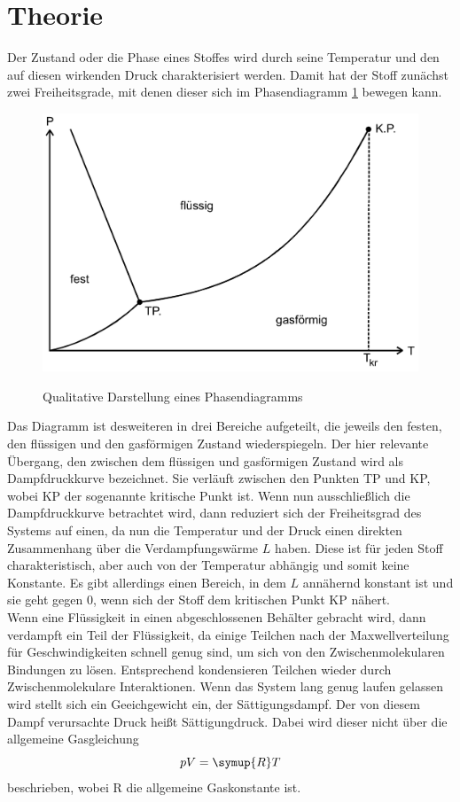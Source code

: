 \section{Theorie}
\label{sec:Theorie}
Der Zustand oder die Phase eines Stoffes wird durch seine Temperatur und den auf diesen wirkenden Druck charakterisiert werden.
Damit hat der Stoff zunächst zwei Freiheitsgrade, mit denen dieser sich im Phasendiagramm \ref{fig:phasendiagramm} bewegen kann.
\begin{figure}[H]
    \centering
    \caption{Qualitative Darstellung eines Phasendiagramms}
    \includegraphics[width=\textwidth]{Bilder/Phasendiagramm.png}%
    \label{fig:phasendiagramm}
\end{figure}
\noindent Das Diagramm ist desweiteren in drei Bereiche aufgeteilt, die jeweils den festen, den flüssigen und den gasförmigen Zustand wiederspiegeln.
Der hier relevante Übergang, den zwischen dem flüssigen und gasförmigen Zustand wird als Dampfdruckkurve bezeichnet.
Sie verläuft zwischen den Punkten TP und KP, wobei KP der sogenannte kritische Punkt ist. Wenn nun ausschließlich die 
Dampfdruckkurve betrachtet wird, dann reduziert sich der Freiheitsgrad des Systems auf einen, da nun die Temperatur und der
Druck einen direkten Zusammenhang über die Verdampfungswärme $L$ haben. Diese ist für jeden Stoff charakteristisch, aber auch 
von der Temperatur abhängig und somit keine Konstante. Es gibt allerdings einen Bereich, in dem $L$ annähernd konstant ist und
sie geht gegen 0, wenn sich der Stoff dem kritischen Punkt KP nähert.\\

\noindent Wenn eine Flüssigkeit in einen abgeschlossenen Behälter gebracht wird, dann verdampft ein Teil der Flüssigkeit, da einige Teilchen
nach der Maxwellverteilung für Geschwindigkeiten schnell genug sind, um sich von den Zwischenmolekularen Bindungen zu lösen. 
Entsprechend kondensieren Teilchen wieder durch Zwischenmolekulare Interaktionen. Wenn das System lang genug laufen gelassen
wird stellt sich ein Geeichgewicht ein, der Sättigungsdampf. Der von diesem Dampf verursachte Druck heißt Sättigungdruck.
Dabei wird dieser nicht über die allgemeine Gasgleichung
\begin{equation}
    pV=\symup{R}T
    \label{eqn:gas}
\end{equation}
beschrieben, wobei R die allgemeine Gaskonstante ist.\\


